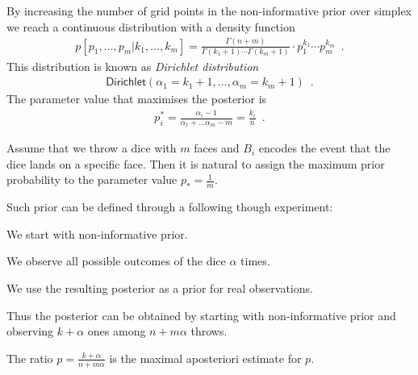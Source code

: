\documentclass[landscape,footrule]{foils}
\begin{document}

By increasing the number of grid points in the non-informative prior over simplex we reach a continuous distribution with a density function
\begin{align*}  
p[p_1,\ldots, p_m|k_1,\ldots, k_m] = \frac{\Gamma(n+m)}{\Gamma(k_1+1)\cdots\Gamma(k_m+1)}\cdot p_1^{k_1}\cdots p_m^{k_m}\enspace.
\end{align*}
This distribution is known as \emph{Dirichlet  distribution}
\begin{align*}
 \mathsf{Dirichlet}(\alpha_1=k_1+1,\ldots, \alpha_m=k_m+1)\enspace.
\end{align*} 
The parameter value that maximises the posterior is 
\begin{align*}
p_i^* =\frac{\alpha_i-1}{\alpha_1+\ldots\alpha_m-m}=\frac{k_i}{n}\enspace.
\end{align*} 



Assume that we throw a dice with $m$ faces and $B_i$ encodes the event that the dice lands on a specific face. Then it is natural to assign the maximum prior probability to the parameter value $p_*=\frac{1}{m}$.
\vspace*{1cm}

Such prior can be defined through a following though experiment:
\begin{triangles}
\item We start with non-informative prior.
\item We observe all possible outcomes of the dice $\alpha$ times.
\item We use the resulting posterior as a prior for real observations. 
\end{triangles}
\vspace*{1cm}

Thus the posterior can be obtained by starting with non-informative prior and observing $k+\alpha$ ones among $n + m\alpha$ throws.  
\begin{triangles}
\item The ratio $p=\frac{k+\alpha}{n+m\alpha}$ is the maximal aposteriori estimate for $p$.
\end{triangles}
\end{document}
